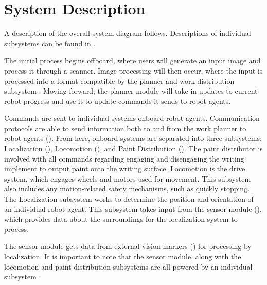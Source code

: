 
\section{System Description}
\label{sec:system_description}



A description of the overall system diagram follows. Descriptions of individual subsystems can be found in .

The initial process begins offboard, where users will generate an input image and process it through a scanner. Image processing will then occur, where the input is processed into a format compatible by the planner and work distribution subsystem . Moving forward, the planner module will take in updates to current robot progress and use it to update commands it sends to robot agents.

Commands are sent to individual systems onboard robot agents. Communication protocols are able to send information both to and from the work planner to robot agents (). From here, onboard systems are separated into three subsystems: Localization (), Locomotion (), and Paint Distribution (). The paint distributor is involved with all commands regarding engaging and disengaging the writing implement to output paint onto the writing surface. Locomotion is the drive system, which engages wheels and motors used for movement. This subsystem also includes any motion-related safety mechanisms, such as quickly stopping. The Localization subsystem works to determine the position and orientation of an individual robot agent. This subsystem takes input from the sensor module (), which provides data about the surroundings for the localization system to process.

The sensor module gets data from external vision markers () for processing by localization. It is important to note that the sensor module, along with the locomotion and paint distribution subsystems are all powered by an individual subsystem .